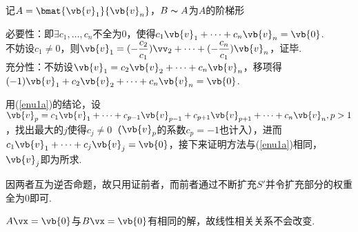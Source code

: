 \begin{analysis}
记$A=\bmat{\vb{v}_1}{\vb{v}_n}$，$B\thicksim A$为$A$的阶梯形
\begin{partlist}
	\item \label{enu1a}必要性：即$\exists c_1,\dots,c_n$不全为$0$，使得$c_1\vb{v}_1+\cdots+c_n\vb{v}_n=\vb{0}$.\\
	不妨设$c_1\ne 0$，则$\vb{v}_1=(-\dfrac{c_2}{c_1})\vv_2+\cdots+(-\dfrac{c_n}{c_1})\vb{v}_n$，证毕.\\
	充分性：不妨设$\vb{v}_1=c_2\vb{v}_2+\cdots+c_n\vb{v}_n$，移项得$(-1)\vb{v}_1+c_2\vb{v}_2+\cdots+c_n\vb{v}_n=\vb{0}$.
	\item 用(\ref{enu1a})的结论，设$\vb{v}_p=c_1\vb{v}_1+\cdots+c_{p-1}\vb{v}_{p-1}+c_{p+1}\vb{v}_{p+1}+\cdots+c_n\vb{v}_n,p>1$，找出最大的$j$使得$c_j\ne 0$（$\vb{v}_p$的系数$c_p=-1$也计入），进而$c_1\vb{v}_1+\cdots+c_j\vb{v}_j=\vb{0}$，接下来证明方法与(\ref{enu1a})相同，$\vb{v}_j$即为所求.
	\item 因两者互为逆否命题，故只用证前者，而前者通过不断扩充$S'$并令扩充部分的权重全为$0$即可.
	\item $A\vx=\vb{0}$与$B\vx=\vb{0}$有相同的解，故线性相关关系不会改变.
\end{partlist}
\end{analysis}

